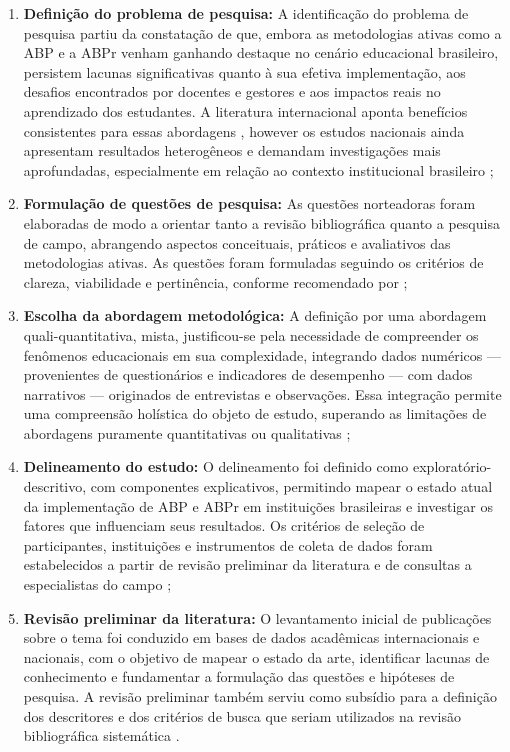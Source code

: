 \begin{enumerate}
    \item \textbf{Definição do problema de pesquisa:} A identificação do problema de pesquisa partiu da constatação de que, embora as metodologias ativas como a ABP e a ABPr venham ganhando destaque no cenário educacional brasileiro, persistem lacunas significativas quanto à sua efetiva implementação, aos desafios encontrados por docentes e gestores e aos impactos reais no aprendizado dos estudantes. A literatura internacional aponta benefícios consistentes para essas abordagens \cite{CRESWELL2018}, however os estudos nacionais ainda apresentam resultados heterogêneos e demandam investigações mais aprofundadas, especialmente em relação ao contexto institucional brasileiro \cite{SANTOS2024};
    \item \textbf{Formulação de questões de pesquisa:} As questões norteadoras foram elaboradas de modo a orientar tanto a revisão bibliográfica quanto a pesquisa de campo, abrangendo aspectos conceituais, práticos e avaliativos das metodologias ativas. As questões foram formuladas seguindo os critérios de clareza, viabilidade e pertinência, conforme recomendado por \cite{CRESWELL2018};
    \item \textbf{Escolha da abordagem metodológica:} A definição por uma abordagem quali-quantitativa, mista, justificou-se pela necessidade de compreender os fenômenos educacionais em sua complexidade, integrando dados numéricos — provenientes de questionários e indicadores de desempenho — com dados narrativos — originados de entrevistas e observações. Essa integração permite uma compreensão holística do objeto de estudo, superando as limitações de abordagens puramente quantitativas ou qualitativas \cite{CRESWELL2018};
    \item \textbf{Delineamento do estudo:} O delineamento foi definido como exploratório-descritivo, com componentes explicativos, permitindo mapear o estado atual da implementação de ABP e ABPr em instituições brasileiras e investigar os fatores que influenciam seus resultados. Os critérios de seleção de participantes, instituições e instrumentos de coleta de dados foram estabelecidos a partir de revisão preliminar da literatura e de consultas a especialistas do campo \cite{SANTOS2024};
    \item \textbf{Revisão preliminar da literatura:} O levantamento inicial de publicações sobre o tema foi conduzido em bases de dados acadêmicas internacionais e nacionais, com o objetivo de mapear o estado da arte, identificar lacunas de conhecimento e fundamentar a formulação das questões e hipóteses de pesquisa. A revisão preliminar também serviu como subsídio para a definição dos descritores e dos critérios de busca que seriam utilizados na revisão bibliográfica sistemática \cite{BARDIN2016}.
\end{enumerate}

